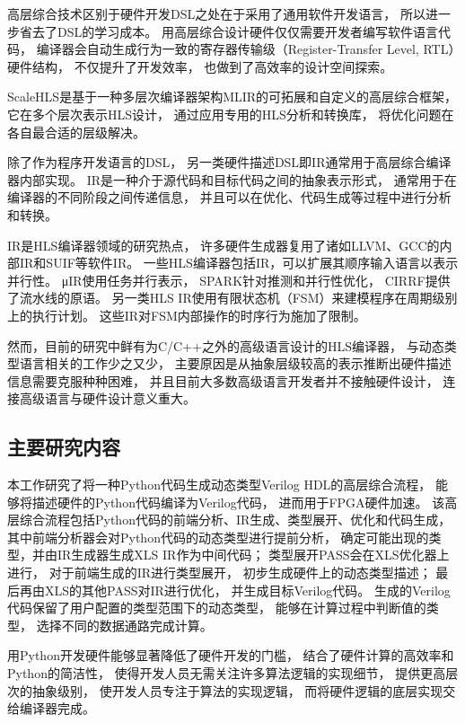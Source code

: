 高层综合技术区别于硬件开发DSL之处在于采用了通用软件开发语言，
所以进一步省去了DSL的学习成本。
用高层综合设计硬件仅仅需要开发者编写软件语言代码，
编译器会自动生成行为一致的寄存器传输级（Register-Transfer Level, RTL）硬件结构，
不仅提升了开发效率，
也做到了高效率的设计空间探索。

ScaleHLS\cite{scalehls}是基于一种多层次编译器架构MLIR\cite{mlir}的可拓展和自定义的高层综合框架，
它在多个层次表示HLS设计，
通过应用专用的HLS分析和转换库，
将优化问题在各自最合适的层级解决。

除了作为程序开发语言的DSL，
另一类硬件描述DSL即IR通常用于高层综合编译器内部实现。
IR是一种介于源代码和目标代码之间的抽象表示形式，
通常用于在编译器的不同阶段之间传递信息，
并且可以在优化、代码生成等过程中进行分析和转换。

IR是HLS编译器领域的研究热点，
许多硬件生成器复用了诸如LLVM、GCC的内部IR和SUIF等软件IR。
一些HLS编译器包括IR，可以扩展其顺序输入语言以表示并行性。
μIR\cite{muir}使用任务并行表示，
SPARK\cite{spark}针对推测和并行性优化，
CIRRF\cite{cirrf}提供了流水线的原语。
另一类HLS IR使用有限状态机（FSM）来建模程序在周期级别上的执行计划。
这些IR对FSM内部操作的时序行为施加了限制。

然而，目前的研究中鲜有为C/C++之外的高级语言设计的HLS编译器，
与动态类型语言相关的工作少之又少，
主要原因是从抽象层级较高的表示推断出硬件描述信息需要克服种种困难，
并且目前大多数高级语言开发者并不接触硬件设计，
连接高级语言与硬件设计意义重大。

\subsection{主要研究内容}

本工作研究了将一种Python代码生成动态类型Verilog HDL的高层综合流程，
能够将描述硬件的Python代码编译为Verilog代码，
进而用于FPGA硬件加速。
该高层综合流程包括Python代码的前端分析、IR生成、类型展开、优化和代码生成，
其中前端分析器会对Python代码的动态类型进行提前分析，
确定可能出现的类型，并由IR生成器生成XLS IR作为中间代码；
类型展开PASS会在XLS优化器上进行，
对于前端生成的IR进行类型展开，
初步生成硬件上的动态类型描述；
最后再由XLS的其他PASS对IR进行优化，
并生成目标Verilog代码。
生成的Verilog代码保留了用户配置的类型范围下的动态类型，
能够在计算过程中判断值的类型，
选择不同的数据通路完成计算。

用Python开发硬件能够显著降低了硬件开发的门槛，
结合了硬件计算的高效率和Python的简洁性，
使得开发人员无需关注许多算法逻辑的实现细节，
提供更高层次的抽象级别，
使开发人员专注于算法的实现逻辑，
而将硬件逻辑的底层实现交给编译器完成。

